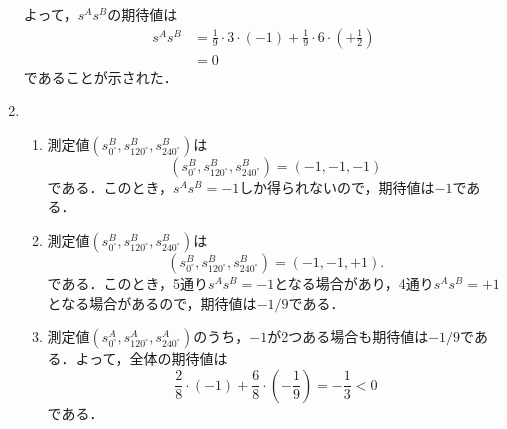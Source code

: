 \documentclass[a4paper,pdflatex,ja=standard]{bxjsarticle}
\begin{document}
\begin{enumerate}
  よって，$s^{A}s^{B}$の期待値は
  \begin{align}
    s^{A}s^{B}
    &=
    \frac{1}{9}\cdot 3\cdot(-1)
    +
    \frac{1}{9}\cdot 6\cdot\left( +\frac{1}{2} \right)
    \nonumber
    \\
    &=
    0
  \end{align}
  であることが示された．

  \item 
  \begin{enumerate}
    \item 
    測定値$(s^{B}_{0^{\circ}},s^{B}_{120^{\circ}},s^{B}_{240^{\circ}})$は
    \begin{equation}
      (s^{B}_{0^{\circ}},s^{B}_{120^{\circ}},s^{B}_{240^{\circ}})
      =
      (-1,-1,-1)
    \end{equation}
    である．このとき，$s^{A}s^{B}=-1$しか得られないので，期待値は$-1$である．

    \item 
    測定値$(s^{B}_{0^{\circ}},s^{B}_{120^{\circ}},s^{B}_{240^{\circ}})$は
    \begin{equation}
      (s^{B}_{0^{\circ}},s^{B}_{120^{\circ}},s^{B}_{240^{\circ}})
      =
      (-1,-1,+1)
      .
    \end{equation}
    である．このとき，5通り$s^{A}s^{B}=-1$となる場合があり，4通り$s^{A}s^{B}=+1$となる場合があるので，期待値は$-1/9$である．

    \item 
    測定値$(s^{A}_{0^{\circ}},s^{A}_{120^{\circ}},s^{A}_{240^{\circ}})$のうち，$-1$が2つある場合も期待値は$-1/9$である．よって，全体の期待値は
    \begin{equation}
      \frac{2}{8}\cdot (-1)
      +
      \frac{6}{8}\cdot \left( -\frac{1}{9} \right)
      =
      -\frac{1}{3}
      <
      0
    \end{equation}
    である．
  \end{enumerate}
\end{enumerate}
\end{document}
